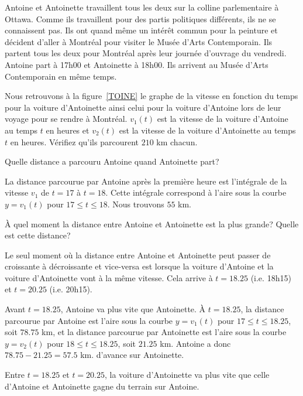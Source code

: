 {

\begin{egg}
Antoine et Antoinette travaillent tous les deux sur la colline
parlementaire à Ottawa.  Comme ils travaillent pour des partis
politiques différents, ils ne se connaissent pas.  Ils ont quand même
un intérêt commun pour la peinture et décident d'aller à Montréal pour
visiter le Musée d'Arts Contemporain.  Ils partent tous les deux pour
Montréal après leur journée d'ouvrage du vendredi.  Antoine part à
17h00 et Antoinette à 18h00.  Ils arrivent au Musée d'Arts
Contemporain en même temps.

Nous retrouvons à la figure~\ref{TOINE} le graphe de la vitesse en
fonction du temps pour la voiture d'Antoinette ainsi celui pour la
voiture d'Antoine lors de leur voyage pour se rendre à Montréal.
$v_1(t)$ est la vitesse de la voiture d'Antoine au temps $t$ en heures
et $v_2(t)$ est la vitesse de la voiture d'Antoinette au temps $t$ en
heures.  Vérifiez qu'ils parcourent $210$ km chacun.

 Quelle distance a parcouru Antoine quand Antoinette part?

La distance parcourue par Antoine après la première heure est
l'intégrale de la vitesse $v_1$ de $t=17$ à $t=18$.  Cette intégrale
correspond à l'aire sous la courbe $y=v_1(t)$ pour $17\leq t\leq 18$.
Nous trouvons $55$ km.

 À quel moment la distance entre Antoine et Antoinette est la
plus grande?  Quelle est cette distance?

Le seul moment où la distance entre Antoine et Antoinette peut passer
de croissante à décroissante et vice-versa est lorsque la voiture
d'Antoine et la voiture d'Antoinette vont à la même vitesse.  Cela
arrive à $t=18.25$ (i.e. 18h15) et $t=20.25$ (i.e. 20h15).

Avant $t=18.25$, Antoine va plus vite que Antoinette.  À $t=18.25$, la
distance parcourue par Antoine est l'aire sous la courbe $y=v_1(t)$
pour $17\leq t \leq 18.25$, soit $78.75$ km, et la distance parcourue
par Antoinette est l'aire sous la courbe $y=v_2(t)$ pour $18\leq t
\leq 18.25$, soit $21.25$ km.  Antoine a donc $78.75-21.25=57.5$
km. d'avance sur Antoinette.

Entre $t=18.25$ et $t=20.25$, la voiture d'Antoinette va plus vite que
celle d'Antoine et Antoinette gagne du terrain sur Antoine.


\end{egg}}

